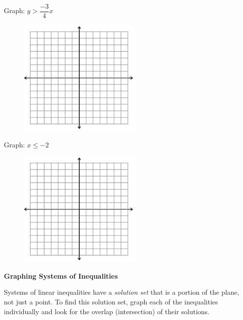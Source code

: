 \begin{example}
Graph: $y > \dfrac{-3}{4}x$
\begin{figure}[h]
\hfill\includegraphics[scale=1.25]{images/plane}
\end{figure}
\vspace{1in}
\end{example}

\begin{example}
Graph: $x \le -2$
\begin{figure}[h]
\hfill\includegraphics[scale=1.25]{images/plane}
\end{figure}
\vspace{1in}
\end{example}

\newpage

\begin{mdframed}
\textbf{Graphing Systems of Inequalities}

Systems of linear inequalities have a \emph{solution set} that is a portion of the plane, not just a point. To find this solution set, graph each of the inequalities individually and look for the overlap (intersection) of their solutions.
\end{mdframed}
\vspace{.2in}

